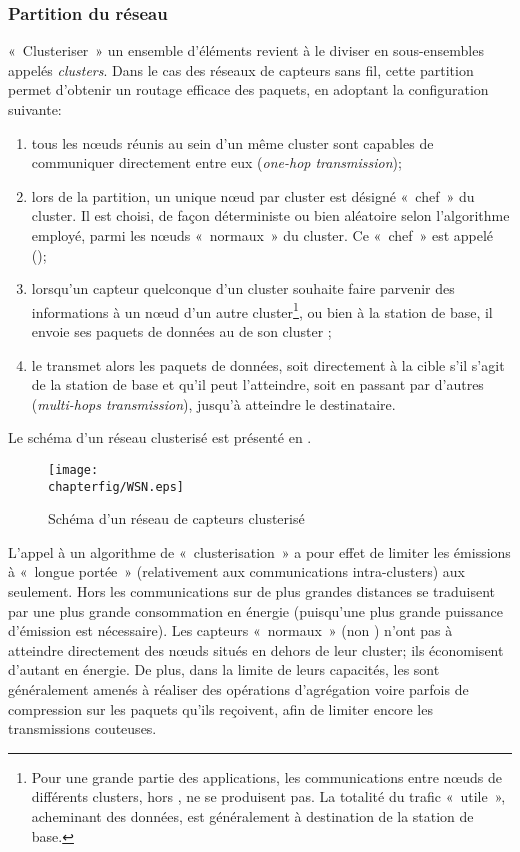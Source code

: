         \subsubsection{Partition du réseau}
«~Clusteriser~» un ensemble d'éléments revient à le diviser en sous-ensembles appelés \textit{clusters}.
Dans le cas des réseaux de capteurs sans fil, cette partition permet d'obtenir un routage efficace des paquets, en adoptant la configuration suivante:
\begin{enumerate}
    \item tous les nœuds réunis au sein d'un même cluster sont capables de communiquer directement entre eux (\textit{one-hop transmission});
    \item lors de la partition, un unique nœud par cluster est désigné «~chef~» du cluster.
        Il est choisi, de façon déterministe ou bien aléatoire selon l'algorithme employé, parmi les nœuds «~normaux~» du cluster.
        Ce «~chef~» est appelé \ch (\CH);
    \item lorsqu'un capteur quelconque d'un cluster souhaite faire parvenir des informations à un nœud d'un autre cluster\footnote{Pour une grande partie des applications, les communications entre nœuds de différents clusters, hors \chs, ne se produisent pas. La totalité du trafic «~utile~», acheminant des données, est généralement à destination de la station de base.}, ou bien à la station de base, il envoie ses paquets de données au \ch de son cluster ;
    \item le \ch transmet alors les paquets de données, soit directement à la cible s'il s'agit de la station de base et qu'il peut l'atteindre, soit en passant par d'autres \chs (\textit{multi-hops transmission}), jusqu'à atteindre le destinataire.
\end{enumerate}
Le schéma d'un réseau clusterisé est présenté en .
\begin{figure}
    \centering
    \texttt{[image: \\chapterfig/WSN.eps]}
    \caption{Schéma d'un réseau de capteurs clusterisé}\label{st:fig:wsn}
\end{figure}
L'appel à un algorithme de « clusterisation » a pour effet de limiter les émissions à «~longue portée~» (relativement aux communications intra-clusters) aux \chs seulement.
Hors les communications sur de plus grandes distances se traduisent par une plus grande consommation en énergie (puisqu'une plus grande puissance d'émission est nécessaire).
Les capteurs «~normaux~» (non \chs) n'ont pas à atteindre directement des nœuds situés en dehors de leur cluster; ils économisent d'autant en énergie.
De plus, dans la limite de leurs capacités, les \chs sont généralement amenés à réaliser des opérations d'agrégation voire parfois de compression sur les paquets qu'ils reçoivent, afin de limiter encore les transmissions couteuses.

